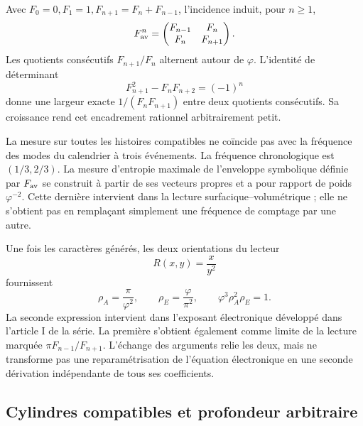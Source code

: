 Avec \(F_0=0,F_1=1,F_{n+1}=F_n+F_{n-1}\), l'incidence induit, pour \(n\geq1\),
\[
 F_{\rm av}^n=\begin{pmatrix}F_{n-1}&F_n\\F_n&F_{n+1}\end{pmatrix}.
\]
Les quotients consécutifs \(F_{n+1}/F_n\) alternent autour de \(\varphi\). L'identité de déterminant
\[
 F_{n+1}^2-F_nF_{n+2}=(-1)^n
\]
donne une largeur exacte \(1/(F_nF_{n+1})\) entre deux quotients consécutifs. Sa croissance rend cet encadrement rationnel arbitrairement petit.

La mesure sur toutes les histoires compatibles ne coïncide pas avec la fréquence des modes du calendrier à trois événements. La fréquence chronologique est \((1/3,2/3)\). La mesure d'entropie maximale de l'enveloppe symbolique définie par \(F_{\rm av}\) se construit à partir de ses vecteurs propres et a pour rapport de poids \(\varphi^{-2}\). Cette dernière intervient dans la lecture surfacique--volumétrique ; elle ne s'obtient pas en remplaçant simplement une fréquence de comptage par une autre.

Une fois les caractères générés, les deux orientations du lecteur
\[
 R(x,y)=\frac{x}{y^2}
\]
fournissent
\begin{equation}
 \rho_A=\frac\pi{\varphi^2},\qquad
 \rho_E=\frac\varphi{\pi^2},\qquad
 \varphi^3\rho_A^2\rho_E=1.
 \label{eq:areal-electron}
\end{equation}
La seconde expression intervient dans l’exposant électronique développé dans l’article I de la série. La première s’obtient également comme limite de la lecture marquée \(\pi F_{n-1}/F_{n+1}\). L’échange des arguments relie les deux, mais ne transforme pas une reparamétrisation de l’équation électronique en une seconde dérivation indépendante de tous ses coefficients.



\subsection{Cylindres compatibles et profondeur arbitraire}

